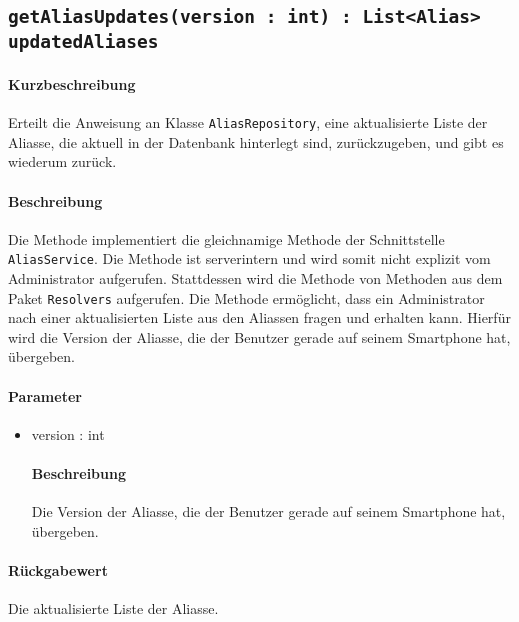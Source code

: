 \subsection{\texttt{getAliasUpdates(version : int) : List<Alias> updatedAliases}}%
\paragraph*{Kurzbeschreibung}
Erteilt die Anweisung an Klasse \texttt{AliasRepository}, eine aktualisierte Liste der Aliasse, die aktuell in der Datenbank hinterlegt sind, zurückzugeben, und gibt es wiederum zurück.
\paragraph*{Beschreibung}
Die Methode implementiert die gleichnamige Methode der Schnittstelle \texttt{AliasService}.
Die Methode ist serverintern und wird somit nicht explizit vom Administrator aufgerufen.
Stattdessen wird die Methode von Methoden aus dem Paket \texttt{Resolvers} aufgerufen.
Die Methode ermöglicht, dass ein Administrator nach einer aktualisierten Liste aus den Aliassen fragen und erhalten kann.
Hierfür wird die Version der Aliasse, die der Benutzer gerade auf seinem Smartphone hat, übergeben.
\paragraph*{Parameter}
\begin{itemize}
    \item version : int
    		\paragraph*{Beschreibung}
    		Die Version der Aliasse, die der Benutzer gerade auf seinem Smartphone hat, übergeben.
\end{itemize}
\paragraph*{Rückgabewert}
Die aktualisierte Liste der Aliasse.
